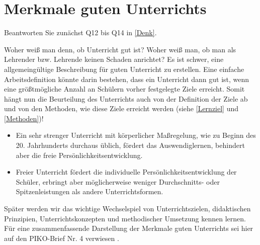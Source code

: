 \chapter{Merkmale guten Unterrichts}\label{GuterUnterricht}

\begin{uea}
	Beantworten Sie zunächst Q12 bis Q14 in \cref{Denk}.
\end{uea}

Woher weiß man denn, ob Unterricht gut ist? Woher weiß man, ob man als Lehrender bzw. Lehrende keinen Schaden 
anrichtet? Es ist schwer,  eine allgemeing{\"u}ltige Beschreibung f{\"u}r guten Unterricht zu erstellen. Eine einfache Arbeitsdefinition k{\"o}nnte darin
bestehen, dass ein Unterricht dann gut ist, wenn eine gr{\"o}{\ss}tm{\"o}gliche Anzahl an Sch{\"u}lern vorher
festgelegte Ziele erreicht. Somit h{\"a}ngt nun die Beurteilung des Unterrichts auch von der Definition der Ziele ab und von den Methoden, wie diese Ziele erreicht werden (siehe \cref{Lernziel} und \ref{Methoden})!

\begin{beisp2}
\begin{itemize}
\item
Ein sehr strenger Unterricht mit k{\"o}rperlicher Ma{\ss}regelung, wie zu Beginn des 20. Jahrhunderts durchaus {\"u}blich,
f{\"o}rdert das Auswendiglernen, behindert aber die freie Pers{\"o}nlichkeitsentwicklung.
\item
Freier Unterricht f{\"o}rdert die individuelle Pers{\"o}nlichkeitsentwicklung der Sch{\"u}ler, erbringt aber 
m{\"o}glicherweise weniger Durchschnitts- oder Spitzenleistungen als andere Unterrichtsformen.
\end{itemize}
\end{beisp2}

Sp{\"a}ter werden wir das wichtige Wechselspiel von Unterrichtszielen, didaktischen Prinzipien, Unterrichtskonzepten und 
methodischer Umsetzung kennen lernen. F{\"u}r eine zusammenfassende Darstellung der Merkmale guten Unterrichts sei
hier auf den PIKO-Brief Nr. 4 verwiesen \autocite{piko4}.

\bip\bip
